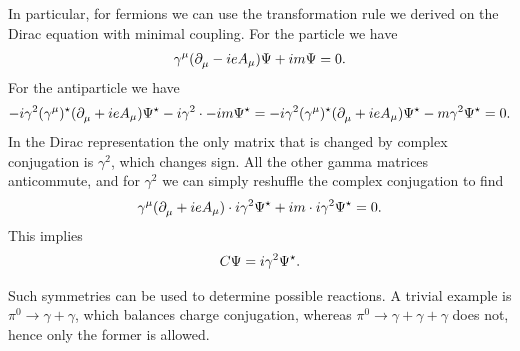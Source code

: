 In particular, for fermions we can use the transformation rule we derived on the Dirac equation with minimal coupling. For the particle we have
\begin{align*}
	\gamma^{\mu}(\partial^{}_{\mu} - ieA_{\mu})\Psi + im\Psi = 0.
\end{align*}
For the antiparticle we have
\begin{align*}
	-i\gamma^{2}(\gamma^{\mu})^{\star}(\partial^{}_{\mu} + ieA_{\mu})\Psi^{\star} - i\gamma^{2}\cdot -im\Psi^{\star} = -i\gamma^{2}(\gamma^{\mu})^{\star}(\partial^{}_{\mu} + ieA_{\mu})\Psi^{\star} - m\gamma^{2}\Psi^{\star} = 0.
\end{align*}
In the Dirac representation the only matrix that is changed by complex conjugation is $\gamma^{2}$, which changes sign. All the other gamma matrices anticommute, and for $\gamma^{2}$ we can simply reshuffle the complex conjugation to find
\begin{align*}
	\gamma^{\mu}(\partial^{}_{\mu} + ieA_{\mu})\cdot i\gamma^{2}\Psi^{\star} + im\cdot i\gamma^{2}\Psi^{\star} = 0.
\end{align*}
This implies
\begin{align*}
	C\Psi = i\gamma^{2}\Psi^{\star}.
\end{align*}

Such symmetries can be used to determine possible reactions. A trivial example is $\pi^{0} \to \gamma + \gamma$, which balances charge conjugation, whereas $\pi^{0} \to \gamma + \gamma + \gamma$ does not, hence only the former is allowed.

